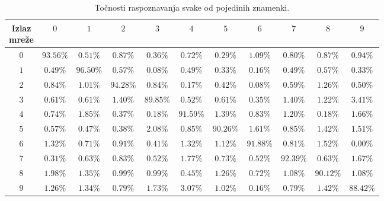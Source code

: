 \begin{table}[htb]
    \caption{Točnosti raspoznavanja svake od pojedinih znamenki.}
    \label{tab:per-number-results}
    \scriptsize
    \centering
    \setlength{\tabcolsep}{0.05cm}
    \begin{tabular}{|c|c|c|c|c|c|c|c|c|c|c|}
        \hline
        \diagbox{Očekivana\\znamenka}{Izlaz\\mreže} & $0$ & $1$ & $2$ & $3$ & $4$ & $5$ & $6$ & $7$ & $8$ & $9$ \\
        \hline
        $0$ & $\boldsymbol{93.56\%}$ & $0.51\%$ & $0.87\%$ & $0.36\%$ & $0.72\%$ & $0.29\%$ & $1.09\%$
        & $0.80\%$ & $0.87\%$ & $0.94\%$ \\
        \hline
        $1$ & $0.49\%$ & $\boldsymbol{96.50\%}$ & $0.57\%$ & $0.08\%$ & $0.49\%$ & $0.33\%$ & $0.16\%$
        & $0.49\%$ & $0.57\%$ & $0.33\%$ \\
        \hline
        $2$ & $0.84\%$ & $1.01\%$ & $\boldsymbol{94.28\%}$ & $0.84\%$ & $0.17\%$ & $0.42\%$ & $0.08\%$
        & $0.59\%$ & $1.26\%$ & $0.50\%$ \\
        \hline
        $3$ & $0.61\%$ & $0.61\%$ & $1.40\%$ & $\boldsymbol{89.85\%}$ & $0.52\%$ & $0.61\%$ & $0.35\%$
        & $1.40\%$ & $1.22\%$ & $3.41\%$ \\
        \hline
        $4$ & $0.74\%$ & $1.85\%$ & $0.37\%$ & $0.18\%$ & $\boldsymbol{91.59\%}$ & $1.39\%$ & $0.83\%$
        & $1.20\%$ & $0.18\%$ & $1.66\%$ \\
        \hline
        $5$ & $0.57\%$ & $0.47\%$ & $0.38\%$ & $2.08\%$ & $0.85\%$ & $\boldsymbol{90.26\%}$ & $1.61\%$
        & $0.85\%$ & $1.42\%$ & $1.51\%$ \\
        \hline
        $6$ & $1.32\%$ & $0.71\%$ & $0.91\%$ & $0.41\%$ & $1.32\%$ & $1.12\%$ & $\boldsymbol{91.88\%}$
        & $0.81\%$ & $1.52\%$ & $0.00\%$ \\
        \hline
        $7$ & $0.31\%$ & $0.63\%$ & $0.83\%$ & $0.52\%$ & $1.77\%$ & $0.73\%$ & $0.52\%$
        & $\boldsymbol{92.39\%}$ & $0.63\%$ & $1.67\%$ \\
        \hline
        $8$ & $1.98\%$ & $1.35\%$ & $0.99\%$ & $0.99\%$ & $0.45\%$ & $1.26\%$ & $0.72\%$ & $1.08\%$
        & $\boldsymbol{90.12\%}$ & $1.08\%$ \\
        \hline
        $9$ & $1.26\%$ & $1.34\%$ & $0.79\%$ & $1.73\%$ & $3.07\%$ & $1.02\%$ & $0.16\%$ & $0.79\%$
        & $1.42\%$ & $\boldsymbol{88.42\%}$ \\
        \hline
    \end{tabular}
\end{table}
